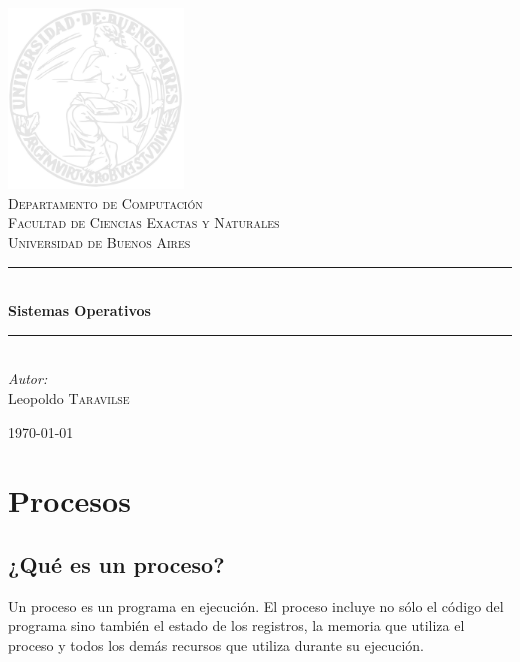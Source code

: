 \documentclass{article}
\newcommand{\HRule}{\rule{\linewidth}{0.5mm}}
\begin{document}
\begin{titlepage}
\begin{center}

\includegraphics[width=0.35\textwidth]{logo_uba}\\[1cm]

\textsc{\LARGE Departamento de Computaci\'on}\\[1.5cm]

\textsc{\Large Facultad de Ciencias Exactas y Naturales}\\[0.5cm]
\textsc{\Large Universidad de Buenos Aires}\\[0.5cm]

\HRule \\[0.4cm]
{ \huge \bfseries Sistemas Operativos \\[0.4cm] }

\HRule \\[1.5cm]

\emph{Autor:}\\
Leopoldo \textsc{Taravilse}

\vfill

{\large \today}

\end{center}
\end{titlepage}
\tableofcontents
\newpage
\section{Procesos}

\subsection{¿Qu\'e es un proceso?}

Un proceso es un programa en ejecuci\'on. El proceso incluye no s\'olo el c\'odigo del programa sino tambi\'en el estado de los registros, la memoria que utiliza el proceso y todos los dem\'as recursos que utiliza durante su ejecuci\'on.
\end{document}
